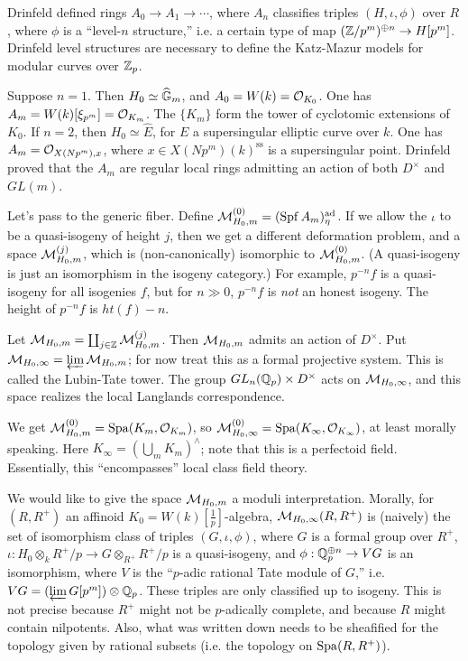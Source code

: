 Drinfeld defined rings $A_0 \to A_1 \to \cdots$, where $A_n$ classifies 
triples $(H,\iota,\phi)$ over $R$, where 
$\phi$ is a ``level-$n$ structure,'' i.e. a certain type of map 
$(\mathbb{Z}/p^m)^{\oplus n} \to H[p^m]$. Drinfeld level structures are necessary to 
define the Katz-Mazur models for modular curves over $\mathbb{Z}_p$. 

Suppose $n=1$. Then $H_0\simeq \widehat{\mathbb{G}}_m$, and $A_0=W(k) = \mathcal{O}_{K_0}$. 
One has $A_m = W(k)[\xi_{p^m}] = \mathcal{O}_{K_m}$. The $\{K_m\}$ form the tower 
of cyclotomic extensions of $K_0$. If $n=2$, then $H_0\simeq \widehat E$, for 
$E$ a supersingular elliptic curve over $k$. One has 
$A_m=\mathcal{O}_{X(N p^m),x}$, where $x\in X(N p^m)(k)^\text{ss}$ is a supersingular 
point. Drinfeld proved that the $A_m$ are regular local rings admitting an 
action of both $D^\times$ and $GL(m)$. 

Let's pass to the generic fiber. Define $\mathcal{M}_{H_0,m}^{(0)}= (\operatorname{Spf} A_m)_\eta^{\textnormal{ad}}$. 
If we allow the $\iota$ to be a quasi-isogeny of height $j$, then we get a 
different deformation problem, and a space $\mathcal{M}_{H_0,m}^{(j)}$, which is 
(non-canonically) isomorphic to $\mathcal{M}_{H_0,m}^{(0)}$. (A quasi-isogeny is 
just an isomorphism in the isogeny category.) For example, 
$p^{-n} f$ is a quasi-isogeny for all isogenies $f$, but for $n\gg 0$, 
$p^{-n} f$ is \emph{not} an honest isogeny. The height of 
$p^{-n} f$ is $ht(f)-n$. 

Let $\mathcal{M}_{H_0,m} = \coprod_{j\in \mathbb{Z}} \mathcal{M}_{H_0,m}^{(j)}$. Then $\mathcal{M}_{H_0,m}$ admits an action of 
$D^\times$. Put $\mathcal{M}_{H_0,\infty} = \varprojlim \mathcal{M}_{H_0,m}$; for now treat 
this as a formal projective system. This is called the Lubin-Tate tower. The 
group $GL_n(\mathbb{Q}_p)\times D^\times$ acts on $\mathcal{M}_{H_0,\infty}$, and this space 
realizes the local Langlands correspondence. 

\begin{example}[$n=1$]
We get $\mathcal{M}_{H_0,m}^{(0)} = \operatorname{Spa}(K_m,\mathcal{O}_{K_m})$, so 
$\mathcal{M}_{H_0,\infty}^{(0)} = \operatorname{Spa}(K_\infty,\mathcal{O}_{K_\infty})$, at least morally 
speaking. Here $K_\infty =(\bigcup_m K_m)^\wedge$; note that this is a perfectoid 
field. Essentially, this ``encompasses'' local class field theory. 
\end{example}

We would like to give the space $\mathcal{M}_{H_0,m}$ a moduli interpretation. Morally, 
for $(R,R^+)$ an affinoid $K_0=W(k)[\frac 1 p]$-algebra, $\mathcal{M}_{H_0,\infty}(R,R^+)$ is 
(naively) the set of isomorphism class of triples $(G,\iota,\phi)$, where 
$G$ is a formal group over $R^+$, $\iota:H_0 \otimes_k R^+/p \to G\otimes_{R^+} R^+/p$ 
is a quasi-isogeny, and $\phi:\mathbb{Q}_p^{\oplus n}\to V G$ is an isomorphism, where 
$V$ is the ``$p$-adic rational Tate module of $G$,'' i.e. 
$V G=(\varprojlim G[p^m])\otimes \mathbb{Q}_p$. These triples are only classified up to 
isogeny. This is not precise because $R^+$ might not be $p$-adically complete, and 
because $R$ might contain nilpotents. Also, what was written down needs to be 
sheafified for the topology given by rational subsets (i.e. the topology on 
$\operatorname{Spa}(R,R^+)$). 

